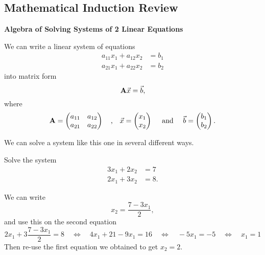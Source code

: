 \subsection{Mathematical Induction Review}
\label{app:induction}

\begin{center}\textbf{\color{cyan}Algebra of Solving Systems of 2 Linear Equations} 	
\end{center}

We can write a linear system of equations 
\begin{align*}
a_{11} x_1 + a_{12} x_2 &= b_1 \\
a_{21} x_1 + a_{22} x_2 &= b_2
\end{align*}
into matrix form
$$
{\bf A} \vec{x} = \vec{b},
$$
where
$$
{\bf A} 
	= \begin{pmatrix} 
		a_{11} & a_{12} \\
		a_{21} & a_{22}
	\end{pmatrix}
	\quad \text{,} \quad 
\vec{x}  
	= \begin{pmatrix} 
		x_{1} \\
		x_{2} 
	\end{pmatrix}
	\quad \text{ and } \quad 
\vec{b}  
	= \begin{pmatrix} 
		b_{1} \\
		b_{2} 
	\end{pmatrix} .
$$

We can solve a system like this one in several different ways.

\begin{example}
Solve the system
\begin{align*}
3x_1+2x_2 &= 7 \\
2x_1+3x_2 & = 8.
\end{align*}
\end{example}

\begin{definition} 
We can write
$$
x_2 = \frac{7-3x_1}{2},
$$
and use this on the second equation
$$
2x_1 + 3\frac{7-3x_1}{2} = 8
	\quad \Leftrightarrow \quad 4x_1 + 21-9x_1=16
	\quad \Leftrightarrow \quad -5x_1 =-5
	\quad \Leftrightarrow \quad x_1 =1
$$
Then re-use the first equation we obtained to get $x_2 = 2$.
	
\end{definition}

